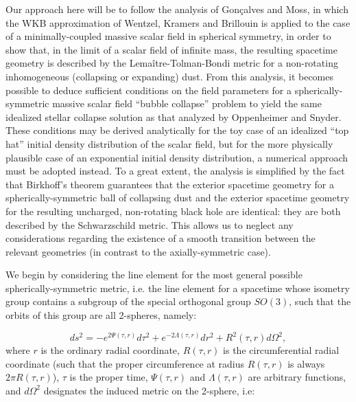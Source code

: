 \documentclass{article}
\begin{document}
Our approach here will be to follow the analysis of Gon\c{c}alves and Moss\cite{goncalves}, in which the WKB approximation of Wentzel\cite{wentzel}, Kramers\cite{kramers} and Brillouin\cite{brillouin} is applied to the case of a minimally-coupled massive scalar field in spherical symmetry, in order to show that, in the limit of a scalar field of infinite mass, the resulting spacetime geometry is described by the Lema\^itre-Tolman-Bondi metric\cite{lemaitre}\cite{tolman}\cite{bondi} for a non-rotating inhomogeneous (collapsing or expanding) dust. From this analysis, it becomes possible to deduce sufficient conditions on the field parameters for a spherically-symmetric massive scalar field ``bubble collapse'' problem to yield the same idealized stellar collapse solution as that analyzed by Oppenheimer and Snyder\cite{oppenheimer}. These conditions may be derived analytically for the toy case of an idealized ``top hat'' initial density distribution of the scalar field, but for the more physically plausible case of an exponential initial density distribution, a numerical approach must be adopted instead. To a great extent, the analysis is simplified by the fact that Birkhoff's theorem guarantees that the exterior spacetime geometry for a spherically-symmetric ball of collapsing dust and the exterior spacetime geometry for the resulting uncharged, non-rotating black hole are identical: they are both described by the Schwarzschild metric. This allows us to neglect any considerations regarding the existence of a smooth transition between the relevant geometries (in contrast to the axially-symmetric case).

We begin by considering the line element for the most general possible spherically-symmetric metric, i.e. the line element for a spacetime whose isometry group contains a subgroup of the special orthogonal group ${SO \left( 3 \right)}$, such that the orbits of this group are all 2-spheres, namely:

\begin{equation}
ds^2 = -e^{2 \Psi \left( \tau, r \right)} d \tau^2 + e^{-2 \Lambda \left( \tau, r \right)} dr^2 + R^2 \left( \tau, r \right) d \Omega^2,
\end{equation}
where $r$ is the ordinary radial coordinate, ${R \left( \tau, r \right)}$ is the circumferential radial coordinate (such that the proper circumference at radius ${R \left( \tau, r \right)}$ is always ${2 \pi R \left( \tau, r \right)}$), ${\tau}$ is the proper time, ${\Psi \left( \tau, r \right)}$ and ${\Lambda \left( \tau, r \right)}$ are arbitrary functions, and ${d \Omega^2}$ designates the induced metric on the 2-sphere, i.e:
\end{document}
